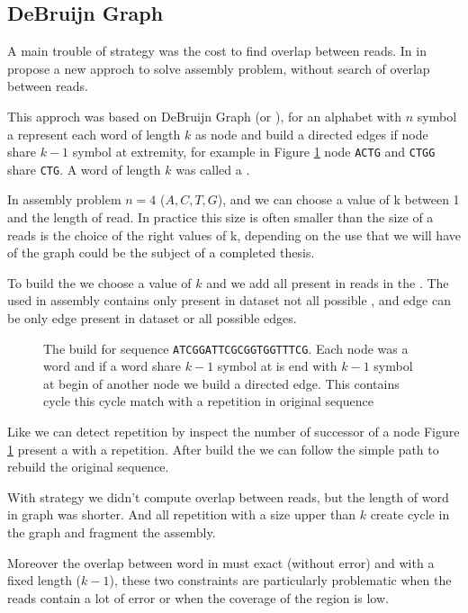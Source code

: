 \documentclass[./main.tex]{subfiles}
\begin{document}
\subsection{DeBruijn Graph}

A main trouble of \OLC strategy was the cost to find overlap between reads. In \citeauthor{eulerian_approach} in \cite{eulerian_approach} propose a new approch to solve assembly problem, without search of overlap between reads.

This approch was based on DeBruijn Graph (or \DBG), for an alphabet with $n$ symbol a \DBG represent each word of length $k$ as node and build a directed edges if node share $k - 1$ symbol at extremity, for example in Figure \ref{intro:fig:dbg:graph} node \texttt{ACTG} and \texttt{CTGG} share \texttt{CTG}. A word of length $k$ was called a \kmer.

In assembly problem $n = 4$ (${A, C, T, G}$), and we can choose a value of k between 1 and the length of read. In practice this size is often smaller than the size of a reads is the choice of the right values of k, depending on the use that we will have of the \DBG graph could be the subject of a completed thesis.

To build the \DBG we choose a value of $k$ and we add all \kmer present in reads in the \DBG. The \DBG used in assembly contains only \kmer present in dataset not all possible \kmer, and edge can be only edge present in dataset or all possible edges.

\begin{figure}[ht]
    \centering
    
    \caption{The \DBG build for sequence \texttt{ATCGGATTCGCGGTGGTTTCG}. Each node was a word and if a word share $k - 1$ symbol at is end with $k - 1$ symbol at begin of another node we build a directed edge. This \DBG contains cycle this cycle match with a repetition in original sequence}
    \label{intro:fig:dbg:graph}
\end{figure}

Like \OLC we can detect repetition by inspect the number of successor of a node Figure \ref{intro:fig:dbg:graph} present a \DBG with a repetition. After build the \DBG we can follow the simple path to rebuild the original sequence.

With \DBG strategy we didn't compute overlap between reads, but the length of word in graph was shorter. And all repetition with a size upper than $k$ create cycle in the graph and fragment the assembly.

Moreover the overlap between word in \DBG must exact (without error) and with a fixed length ($k - 1$), these two constraints are particularly problematic when the reads contain a lot of error or when the coverage of the region is low. 
\end{document}
